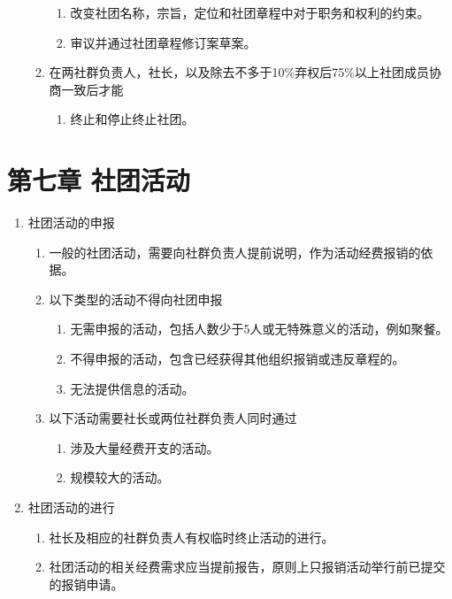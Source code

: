 \documentclass[a4paper]{article}
\newcommand\liststyleWWNumiii{%
\renewcommand\theenumi{\arabic{enumi}}
\renewcommand\theenumii{\arabic{enumi}.\arabic{enumii}}
\renewcommand\theenumiii{\arabic{enumi}.\arabic{enumii}.\arabic{enumiii}}
\renewcommand\theenumiv{\arabic{enumi}.\arabic{enumii}.\arabic{enumiii}.\arabic{enumiv}}
\renewcommand\labelenumi{\theenumi.}
\renewcommand\labelenumii{\theenumii.}
\renewcommand\labelenumiii{\theenumiii.}
\renewcommand\labelenumiv{\theenumiv.}
}
\begin{document}
\begin{enumerate}
\begin{enumerate}
\begin{enumerate}
\item 改变社团名称，宗旨，定位和社团章程中对于职务和权利的约束。
\item 审议并通过社团章程修订案草案。
\end{enumerate}
\item 在两社群负责人，社长，以及除去不多于10\%弃权后75\%以上社团成员协商一致后才能

\begin{enumerate}
\item 终止和停止终止社团。
\end{enumerate}
\end{enumerate}
\end{enumerate}

\bigskip

\section[第七章 社团活动]{第七章 社团活动}
\liststyleWWNumiii
\begin{enumerate}
\item 社团活动的申报

\begin{enumerate}
\item 一般的社团活动，需要向社群负责人提前说明，作为活动经费报销的依据。
\item 以下类型的活动不得向社团申报

\begin{enumerate}
\item 无需申报的活动，包括人数少于5人或无特殊意义的活动，例如聚餐。
\item 不得申报的活动，包含已经获得其他组织报销或违反章程的。
\item 无法提供信息的活动。
\end{enumerate}
\item 以下活动需要社长或两位社群负责人同时通过

\begin{enumerate}
\item 涉及大量经费开支的活动。
\item 规模较大的活动。
\end{enumerate}
\end{enumerate}
\item 社团活动的进行

\begin{enumerate}
\item 社长及相应的社群负责人有权临时终止活动的进行。
\item 社团活动的相关经费需求应当提前报告，原则上只报销活动举行前已提交的报销申请。
\end{enumerate}
\end{enumerate}
\end{document}

